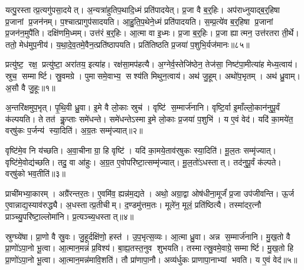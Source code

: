 यत्पु॒रस्तात्प्र॒त्यगु॑पसा॒दयेत्।
अ॒न्यत्रा॑हुतिप॒थादि॒ध्मं प्रति॑पादयेत्।
प्र॒जा वै ब॒र्॒हिः।
अप॑राध्नुयाद्ब॒र्॒हिषा प्र॒जानां प्र॒जन॑नम्।
प॒श्चात्प्रागुप॑सादयति।
आ॒हु॒ति॒प॒थेने॒ध्मं प्रति॑पादयति।
स॒म्प्र॒त्ये॑व ब॒र्॒हिषा प्र॒जानां प्र॒जन॑न॒मुपै॑ति।
दक्षि॑णमि॒ध्मम्।
उत्त॑रं ब॒र्॒हिः।
आ॒त्मा वा इ॒ध्मः।
प्र॒जा ब॒र्॒हिः।
प्र॒जा ह्यात्मन॒ उत्त॑रतरा ती॒र्थे।
ततो॒ मेध॑मुप॒नीय॑।
य॒था॒दे॒व॒तमे॒वैन॒त्प्रति॑ष्ठापयति।
प्रति॑तिष्ठति प्र॒जया॑ प॒शुभि॒र्यज॑मानः॥८५॥\anuvakamend[वृ॒श्च॒ति॒ सा॒द॒ये॒दि॒ध्मः पञ्च॑ च]




\clearpage
{}
\setcounter{anuvakam}{0}

प्रत्यु॑ष्ट॒ रक्ष॒ प्रत्यु॑ष्टा॒ अरा॑तय॒ इत्या॑ह।
रक्ष॑सा॒मप॑हत्यै।
अ॒ग्नेर्व॒स्तेजि॑ष्ठेन॒ तेज॑सा॒ निष्ट॑पा॒मीत्या॑ह मेध्य॒त्वाय॑।
स्रुच॒ सम्मार्ष्टि।
स्रु॒वमग्रे।
पुमासमे॒वाभ्य॒ सश्य॑ति मिथुन॒त्वाय॑।
अथ॑ जु॒हूम्।
अथो॑प॒भृतम्।
अथ॑ ध्रु॒वाम्।
अ॒सौ वै जु॒हूः॥१॥

अ॒न्तरि॑क्षमुप॒भृत्।
पृ॒थि॒वी ध्रु॒वा।
इ॒मे वै लो॒काः स्रुच॑।
वृष्टि॑ स॒म्मार्ज॑नानि।
वृष्टि॒र्वा इ॒माँल्लो॒कान॑नुपू॒र्वं क॑ल्पयति।
ते तत॑ कॢ॒प्ताः समे॑धन्ते।
समे॑धन्तेऽस्मा इ॒मे लो॒काः प्र॒जया॑ प॒शुभि॑।
य ए॒वं वेद॑।
यदि॑ का॒मये॑त॒ वर्‌षु॑कः प॒र्जन्य॑ स्या॒दिति॑।
अ॒ग्र॒तः सम्मृ॑ज्यात्॥२॥

वृष्टि॑मे॒व नि य॑च्छति।
अ॒वा॒चीनाग्रा॒ हि वृष्टि॑।
यदि॑ का॒मये॒ताव॑र्‌षुकः स्या॒दिति॑।
मू॒ल॒तः सम्मृ॑ज्यात्।
वृष्टि॑मे॒वोद्य॑च्छति।
तदु॒ वा आ॑हुः।
अ॒ग्र॒त ए॒वोपरि॑ष्टा॒त्सम्मृ॑ज्यात्।
मू॒ल॒तो॑ऽधस्तात्।
तद॑नुपू॒र्वं क॑ल्पते।
वर्‌षु॑को भव॒तीति॑॥३॥

प्राची॑मभ्या॒कारम्।
अग्रै॑रन्तर॒तः।
ए॒वमि॑व॒ ह्यन्न॑म॒द्यते।
अथो॒ अग्रा॒द्वा ओष॑धीना॒मूर्जं॑ प्र॒जा उप॑जीवन्ति।
ऊ॒र्ज ए॒वान्नाद्य॒स्याव॑रुद्ध्यै।
अ॒धस्तात्प्र॒तीचीम्।
द॒ण्डमु॑त्तम॒तः।
मूले॑न॒ मूलं॒ प्रति॑ष्ठित्यै।
तस्मा॑दर॒त्नौ प्राञ्च्यु॒परि॑ष्टा॒ल्लोमा॑नि।
प्र॒त्यञ्च्य॒धस्तात्॥४॥

स्रुग्घ्ये॑षा।
प्रा॒णो वै स्रु॒वः।
जु॒हूर्दक्षि॑णो॒ हस्त॑।
उ॒प॒भृत्स॒व्यः।
आ॒त्मा ध्रु॒वा।
अन्न स॒म्मार्ज॑नानि।
मु॒ख॒तो वै प्रा॒णो॑ऽपा॒नो भू॒त्वा।
आ॒त्मान॒मन्नं॑ प्र॒विश्य॑।
बा॒ह्य॒तस्त॒नुव शुभयति।
तस्मात्स्रु॒वमे॒वाग्रे॒ सम्मार्ष्टि।
मु॒ख॒तो हि प्रा॒णो॑ऽपा॒नो भू॒त्वा।
आ॒त्मान॒मन्न॑मावि॒शति॑।
तौ प्रा॑णापा॒नौ।
अव्य॑र्धुकः प्राणापा॒नाभ्यां भवति।
य ए॒वं वेद॑॥५॥\anuvakamend[जु॒हूर्मृ॑ज्याद्भव॒तीति॑ प्र॒त्यञ्च्य॒धस्तान्मार्ष्टि॒ पञ्च॑ च]

